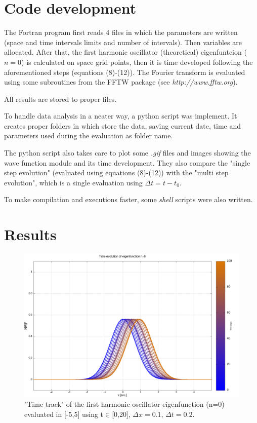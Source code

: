 \documentclass[12pt, a4paper, notitlepage]{report}
\begin{document}
\section*{Code development}
The Fortran program first reads 4 files in which the parameters are written (space and time intervals limits and number of intervals). Then variables are allocated. After that, the first harmonic oscillator (theoretical) eigenfuntcion ($n = 0$) is calculated on space grid points, then it is time developed following the aforementioned steps (equations (8)-(12)). The Fourier transform is evaluated using some subroutines from the FFTW package (see \textit{http://www.fftw.org}).

All results are stored to proper files.

To handle data analysis in a neater way, a python script was implement. It creates proper folders in which store the data, saving current date, time and parameters used during the evaluation as folder name.

The python script also takes care to plot some \textit{.gif} files and images showing the wave function module and its time development. They also compare the "single step evolution" (evaluated using equations (8)-(12)) with the "multi step evolution", which is a single evaluation using $\Delta t = t - t_0 $.

To make compilation and executions faster, some \textit{shell} scripts were also written. 

\section*{Results}

\begin{figure}[h!]
	\centering
	\includegraphics[scale=0.25]{col_t_steps__L5,0_deltax0,1_Ttot20,0_deltat0,2.png}
	\caption{"Time track" of the first harmonic oscillator eigenfunction (n=0) evaluated in [-5,5] using t$\in$[0,20], $\Delta x = 0.1$, $\Delta t = 0.2$.}
\end{figure}
\end{document}
